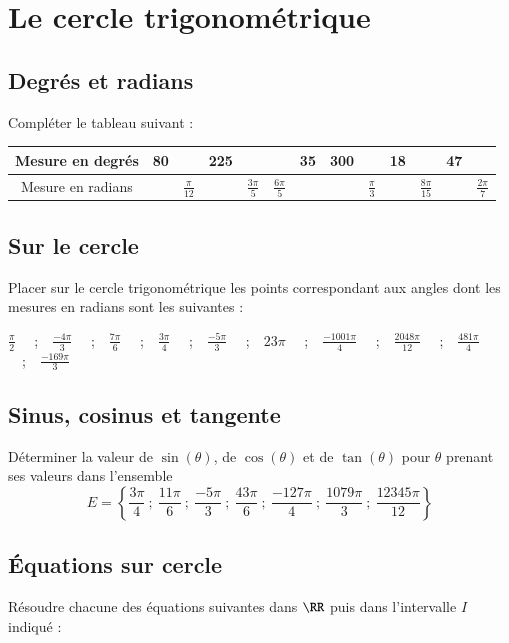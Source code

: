 \documentclass[oneside,12pt]{article}          %
\begin{document}
\section{Le cercle trigonométrique}

\subsection{Degrés et radians}

Compléter le tableau suivant :

\begin{center}
\renewcommand{\arraystretch}{2}
\begin{tabular}{|c|C|C|C|C|C|C|C|C|C|C|C|C|} \hline
    Mesure en degrés & 80 & & 225 & & & 35 & 300 & & 18 & & 47 &  \\ \hline
    Mesure en radians & & $\frac{\pi}{12}$ & &$\frac{3\pi}{5}$ & $\frac{6\pi}{5}$ & & & $\frac{\pi}{3}$ & & $\frac{8\pi}{15}$ & & $\frac{2\pi}{7}$ \\ \hline
\end{tabular}
\end{center}


\subsection{Sur le cercle}

Placer sur le cercle trigonométrique les points correspondant aux angles dont les mesures en radians sont les suivantes : 
\begin{center}
    \large $\frac{\pi}{2}$ ~~;~~$\frac{-4\pi}{3}$ ~~;~~$\frac{7\pi}{6}$ ~~;~~$\frac{3\pi}{4}$ ~~;~~$\frac{-5\pi}{3}$ ~~;~~$23\pi$ ~~;~~$\frac{-1001\pi}{4}$ ~~;~~$\frac{2048\pi}{12}$ ~~;~~$\frac{481\pi}{4}$ ~~;~~$\frac{-169\pi}{3}$
\end{center}



\subsection{Sinus, cosinus et tangente}
Déterminer la valeur de $\sin(\theta)$, de $\cos(\theta)$ et de $\tan(\theta)$ pour $\theta$ prenant ses valeurs dans l'ensemble
\[ E=\left\{ \dfrac{3\pi}{4} ~;~ \dfrac{11\pi}{6} ~;~ \dfrac{-5\pi}{3} ~;~ \dfrac{43\pi}{6} ~;~ \dfrac{-127\pi}{4} ~;~ \dfrac{1079\pi}{3} ~;~ \dfrac{12345\pi}{12} \right\} \]


\subsection{Équations sur cercle}
Résoudre chacune des équations suivantes dans $\RR$ puis dans l'intervalle $I$ indiqué :
\end{document}
